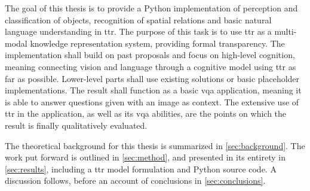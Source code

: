 The goal of this thesis is to provide a Python implementation of perception and classification of objects, recognition of spatial relations and basic natural language understanding in \gls{ttr}.
The purpose of this task is to use \gls{ttr} as a multi-modal knowledge representation system, providing formal transparency.
The implementation shall build on past proposals and focus on high-level cognition, meaning connecting vision and language through a cognitive model using \gls{ttr} as far as possible.
Lower-level parts shall use existing solutions or basic placeholder implementations.
The result shall function as a basic \gls{vqa} application, meaning it is able to answer questions given with an image as context.
The extensive use of \gls{ttr} in the application, as well as its \gls{vqa} abilities, are the points on which the result is finally qualitatively evaluated.

The theoretical background for this thesis is summarized in \autoref{sec:background}.
The work put forward is outlined in \autoref{sec:method}, and presented in its entirety in \autoref{sec:results}, including a \gls{ttr} model formulation and Python source code.
A discussion follows, before an account of conclusions in \autoref{sec:conclusions}.
